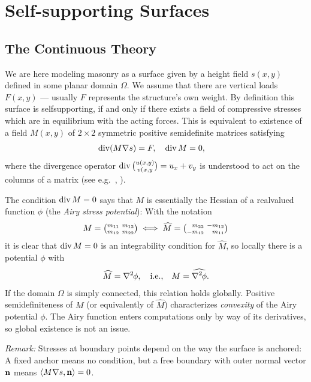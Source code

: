\documentclass[review]{acmsiggraph}
\def\<{\mathchoice{\big\langle}{\langle}{\langle}{\langle}}
\def\>{\mathchoice{\big\rangle}{\rangle}{\rangle}{\rangle}}
\def\wh{\widehat}
\def\Div{\mathop{{\rm div}}\nolimits}
\def\ess{s}
\def\Hess#1{{\def\testess{#1}\nabla^2\ifx\testess\ess\!s\else #1\fi}}
\def\Hess#1{\text{$\nabla^2\hskip-.2ex #1$}}
\begin{document}

\section{Self-supporting Surfaces}

\subsection{The Continuous Theory}

We are here modeling masonry as a surface given by a height field $s(x,y)$ 
defined in some planar domain $\Omega$. We assume that there are vertical 
loads $F(x,y)$ --- usually $F$ represents the structure's own weight. By 
definition this surface is self\dash supporting, if and only if there 
exists a field of compressive stresses which are in equilibrium with the 
acting forces. This is equivalent to existence of a field $M(x,y)$ of 
$2\times 2$ symmetric positive semidefinite matrices satisfying
	\begin{align}
	\Div (M\nabla s) = F, \quad
	\Div M &= 0,
	  \label{eq:conds}
	\end{align}
 where the divergence operator $\Div{u(x,y)\choose v(x,y}= u_x + v_y$ is 
understood to act on the columns of a matrix (see e.g.\ 
\cite{Fraternali2010}, \cite{Giaquinta1985}).

The condition $\Div M=0$ says that $M$ is essentially the Hessian of a 
real\dash valued function $\phi$ (the {\em Airy stress potential}): With 
the notation
	\begin{align*}
	M =
	{\textstyle {m_{11} \ m_{12} \choose m_{12} \ m_{22}}}
	\iff	
	\wh M =
	{\textstyle {\hphantom{-}m_{22} \ -m_{12} \choose -m_{12}
		 \ \hphantom{-}m_{11}}}
	\end{align*}
 it is clear that $\Div M=0$ is an integrability condition for $\wh M$, so
locally there is a potential $\phi$ with
	\begin{align*}
	\wh M = \Hess\phi, \quad \text{i.e.,}\quad
	M = \wh{\Hess\phi}.
	\end{align*}
 If the domain $\Omega$ is simply connected, this relation holds globally. 
Positive semidefiniteness of $M$ (or equivalently of $\wh M$) 
characterizes {\em convexity} of the Airy potential $\phi$. The Airy 
function enters computations only by way of its derivatives, so global 
existence is not an issue.

{\it Remark:} Stresses at boundary points depend on the way the surface is 
anchored: A fixed anchor means no condition, but a free boundary with 
outer normal vector ${\mathbf n}$ means $\<M \nabla s, \nw \> = 0$.
\end{document}
